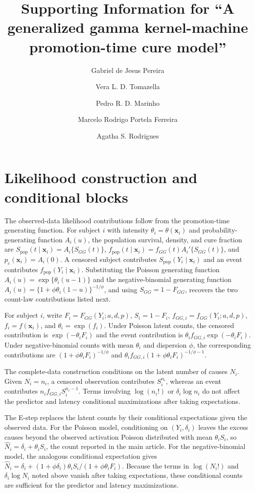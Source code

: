 \documentclass[11pt]{article}
\title{Supporting Information for ``A generalized gamma kernel-machine promotion-time cure model''}
\author{Gabriel de Jesus Pereira \and Vera L. D. Tomazella \and Pedro R. D. Marinho \and Marcelo Rodrigo Portela Ferreira \and Agatha S. Rodrigues}
\date{}
\begin{document}
\maketitle

\section{Likelihood construction and conditional blocks}\label{sec:supp-likelihood}

The observed-data likelihood contributions follow from the promotion-time generating function. For subject $i$ with intensity $\theta_i=\theta(\bm{x}_i)$ and probability-generating function $A_i(u)$, the population survival, density, and cure fraction are $S_{\mathrm{pop}}(t\mid\bm{x}_i)=A_i\{S_{GG}(t)\}$, $f_{\mathrm{pop}}(t\mid\bm{x}_i)=f_{GG}(t)A_i'\{S_{GG}(t)\}$, and $p_c(\bm{x}_i)=A_i(0)$. A censored subject contributes $S_{\mathrm{pop}}(Y_i\mid\bm{x}_i)$ and an event contributes $f_{\mathrm{pop}}(Y_i\mid\bm{x}_i)$. Substituting the Poisson generating function $A_i(u)=\exp\{\theta_i(u-1)\}$ and the negative-binomial generating function $A_i(u)=\{1+\phi\theta_i(1-u)\}^{-1/\phi}$, and using $S_{GG}=1-F_{GG}$, recovers the two count-law contributions listed next.

For subject $i$, write $F_i=F_{GG}(Y_i;a,d,p)$, $S_i=1-F_i$, $f_{GG,i}=f_{GG}(Y_i;a,d,p)$, $f_i=f(\bm{x}_i)$, and $\theta_i=\exp(f_i)$. Under Poisson latent counts, the censored contribution is $\exp(-\theta_iF_i)$ and the event contribution is $\theta_i f_{GG,i}\exp(-\theta_iF_i)$. Under negative-binomial counts with mean $\theta_i$ and dispersion $\phi$, the corresponding contributions are $(1+\phi\theta_iF_i)^{-1/\phi}$ and $\theta_i f_{GG,i}(1+\phi\theta_iF_i)^{-1/\phi-1}$.

The complete-data construction conditions on the latent number of causes $N_i$. Given $N_i=n_i$, a censored observation contributes $S_i^{n_i}$, whereas an event contributes $n_i f_{GG,i}S_i^{n_i-1}$. Terms involving $\log(n_i!)$ or $\delta_i\log n_i$ do not affect the predictor and latency conditional maximizations after taking expectations.

The E-step replaces the latent counts by their conditional expectations given the observed data. For the Poisson model, conditioning on $(Y_i,\delta_i)$ leaves the excess causes beyond the observed activation Poisson distributed with mean $\theta_i S_i$, so $\widehat N_i=\delta_i+\theta_i S_i$, the count reported in the main article. For the negative-binomial model, the analogous conditional expectation gives $\widehat N_i=\delta_i+(1+\phi\delta_i)\theta_i S_i/(1+\phi\theta_i F_i)$. Because the terms in $\log(N_i!)$ and $\delta_i\log N_i$ noted above vanish after taking expectations, these conditional counts are sufficient for the predictor and latency maximizations.
\end{document}
